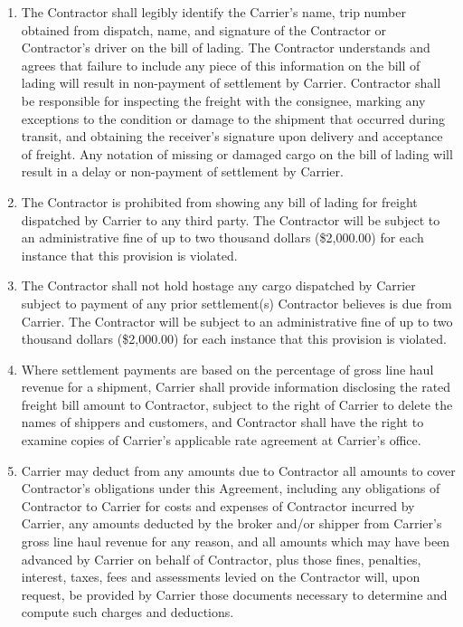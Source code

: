 \begin{enumerate}[ 
    ref = \SecondLevelEnumerator
]
    \item The Contractor shall legibly identify the Carrier's name, trip
    number obtained from dispatch, name, and signature of the Contractor or
    Contractor's driver on the bill of lading. The Contractor understands
    and agrees that failure to include any piece of this information on the
    bill of lading will result in non-payment of settlement by Carrier.
    Contractor shall be responsible for inspecting the freight with the
    consignee, marking any exceptions to the condition or damage to the
    shipment that occurred during transit, and obtaining the receiver's
    signature upon delivery and acceptance of freight. Any notation of
    missing or damaged cargo on the bill of lading will result in a delay
    or non-payment of settlement by Carrier.

    \item The Contractor is prohibited from showing any bill of lading for
    freight dispatched by Carrier to any third party. The Contractor will
    be subject to an administrative fine of up to two thousand dollars
    (\$2,000.00) for each instance that this provision is violated.

    \item The Contractor shall not hold hostage any cargo dispatched by
    Carrier subject to payment of any prior settlement(s) Contractor
    believes is due from Carrier. The Contractor will be subject to an
    administrative fine of up to two thousand dollars (\$2,000.00) for each
    instance that this provision is violated.

    \item Where settlement payments are based on the percentage of gross
    line haul revenue for a shipment, Carrier shall provide information
    disclosing the rated freight bill amount to Contractor, subject to the
    right of Carrier to delete the names of shippers and customers, and
    Contractor shall have the right to examine copies of Carrier's
    applicable rate agreement at Carrier's office.

    \item Carrier may deduct from any amounts due to Contractor all amounts
    to cover Contractor's obligations under this Agreement, including any
    obligations of Contractor to Carrier for costs and expenses of
    Contractor incurred by Carrier, any amounts deducted by the broker
    and/or shipper from Carrier's gross line haul revenue for any reason,
    and all amounts which may have been advanced by Carrier on behalf of
    Contractor, plus those fines, penalties, interest, taxes, fees and
    assessments levied on the Contractor will, upon request, be provided by
    Carrier those documents necessary to determine and compute such charges
    and deductions.
\end{enumerate}